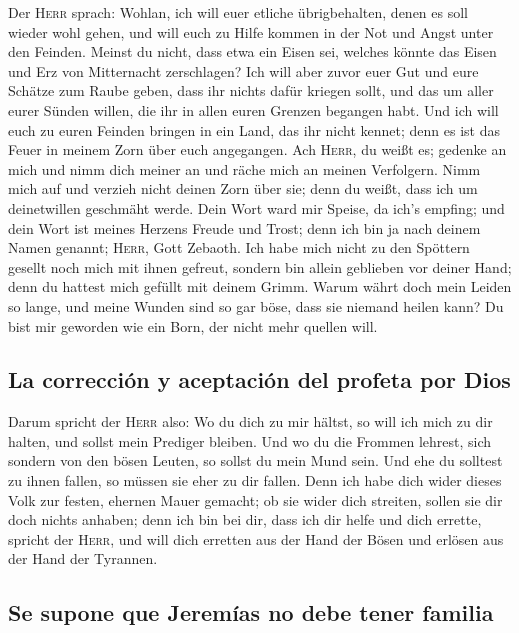  Der \textsc{Herr} sprach: Wohlan, ich will euer etliche
übrigbehalten, denen es soll wieder wohl gehen, und will euch zu Hilfe
kommen in der Not und Angst unter den Feinden.  Meinst du
nicht, dass etwa ein Eisen sei, welches könnte das Eisen und Erz von
Mitternacht zerschlagen?  Ich will aber zuvor euer Gut
und eure Schätze zum Raube geben, dass ihr nichts dafür kriegen sollt,
und das um aller eurer Sünden willen, die ihr in allen euren Grenzen
begangen habt.  Und ich will euch zu euren Feinden
bringen in ein Land, das ihr nicht kennet; denn es ist das Feuer in
meinem Zorn über euch angegangen.  Ach \textsc{Herr}, du
weißt es; gedenke an mich und nimm dich meiner an und räche mich an
meinen Verfolgern. Nimm mich auf und verzieh nicht deinen Zorn über sie;
denn du weißt, dass ich um deinetwillen geschmäht werde. 
Dein Wort ward mir Speise, da ich's empfing; und dein Wort ist meines
Herzens Freude und Trost; denn ich bin ja nach deinem Namen genannt;
\textsc{Herr}, Gott Zebaoth.  Ich habe mich nicht zu den
Spöttern gesellt noch mich mit ihnen gefreut, sondern bin allein
geblieben vor deiner Hand; denn du hattest mich gefüllt mit deinem
Grimm.  Warum währt doch mein Leiden so lange, und meine
Wunden sind so gar böse, dass sie niemand heilen kann? Du bist mir
geworden wie ein Born, der nicht mehr quellen will.

\hypertarget{la-correcciuxf3n-y-aceptaciuxf3n-del-profeta-por-dios}{%
\subsection{La corrección y aceptación del profeta por
Dios}\label{la-correcciuxf3n-y-aceptaciuxf3n-del-profeta-por-dios}}

 Darum spricht der \textsc{Herr} also: Wo du dich zu mir
hältst, so will ich mich zu dir halten, und sollst mein Prediger
bleiben. Und wo du die Frommen lehrest, sich sondern von den bösen
Leuten, so sollst du mein Mund sein. Und ehe du solltest zu ihnen
fallen, so müssen sie eher zu dir fallen.  Denn ich habe
dich wider dieses Volk zur festen, ehernen Mauer gemacht; ob sie wider
dich streiten, sollen sie dir doch nichts anhaben; denn ich bin bei dir,
dass ich dir helfe und dich errette, spricht der \textsc{Herr},
 und will dich erretten aus der Hand der Bösen und
erlösen aus der Hand der Tyrannen.

\hypertarget{se-supone-que-jeremuxedas-no-debe-tener-familia}{%
\subsection{Se supone que Jeremías no debe tener
familia}\label{se-supone-que-jeremuxedas-no-debe-tener-familia}}

